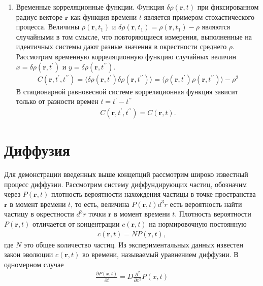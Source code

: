 \documentclass[14pt]{extarticle}
\newcommand{\vr}{\mathbf{r}}
\newcommand{\pr}{\prime}
\begin{document}
\begin{enumerate}
\item Временные корреляционные функции. Функция $\delta \rho(\vr, t)$ при фиксированном радиус-векторе $\vr$ как функция времени $t$ является примером стохастического процесса. Величины $\rho(\vr, t_1)$ и $\delta \rho(\vr, t_1) = \rho(\vr, t_1) - \rho$ являются случайными в том смысле, что повторяющиеся измерения, выполненные на идентичных системы дают разные значения в окрестности среднего $\rho$. Рассмотрим временную корреляционную функцию случайных величин $x = \delta \rho(\vr, t^\pr)$ и $y = \delta \rho(\vr, t^{\pr\pr})$. 
\begin{gather}
	C(\vr, t^\pr, t^{\pr\pr}) = \langle \delta \rho(\vr, t^\pr) \delta \rho(\vr, t^{\pr\pr}) \rangle = \langle \rho(\vr, t^\pr)\rho(\vr, t^{\pr\pr})\rangle - \rho^2 \label{1.196}
\end{gather}
В стационарной равновесной системе корреляционная функция зависит только от разности времен $t = t^\pr - t^{\pr\pr}$
\begin{gather}
	C(\vr, t^\pr, t^{\pr\pr}) = C(\vr, t). \label{1.197}
\end{gather}
\end{enumerate}

\section{Диффузия}
Для демонстрации введенных выше концепций рассмотрим широко известный процесс диффузии. Рассмотрим систему диффундирующих частиц, обозначим через $P(\vr, t)$ плотность вероятности нахождения частицы в точке пространства $\vr$ в момент времени $t$, то есть, величина $P(\vr, t) d^3r$ есть вероятность найти частицу в окрестности $d^3r$ точки $\vr$ в момент времени $t$. Плотность вероятности $P(\vr, t)$ отличается от концентрации $c(\vr, t)$ на нормировочную постоянную
\begin{gather}
	c(\vr, t) = N P(\vr, t), \label{1.199}
\end{gather}
где $N$ это общее количество частиц. Из экспериментальных данных известен закон эволюции $c(\vr, t)$ во времени, называемый уравнением диффузии. В одномерном случае
\begin{gather}
	\frac{\partial P(x, t)}{\partial t} = D \frac{\partial^2}{\partial x^2} P(x, t) \label{1.200}
\end{gather}
\end{document}

